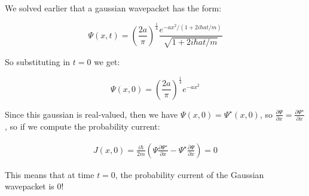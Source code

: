 \documentclass{article}
\begin{document}
\begin{enumerate}[label=(\alph*)]
    \begin{solution}
        We solved earlier that a gaussian wavepacket has the form:
        
        \[ \Psi(x, t) = \left(\frac{2a}{\pi}\right)^{\frac{1}{4}} \frac{e^{-ax^2/(1 + 2i\hbar at/m)}}{\sqrt{1 + 2i\hbar a t/m}}\]

        So substituting in $t = 0$ we get: 

        \[ \Psi(x, 0) = \left(\frac{2a}{\pi}\right)^{\frac{1}{4}} e^{-ax^2}\]

        Since this gaussian is real-valued, then we have $\Psi(x, 0) = \Psi^\star(x, 0)$, so $\frac{\partial \Psi}{\partial x} = \frac{\partial \Psi^\star}{\partial x}$, so if we compute the probability current:

        \begin{align*}
            J(x, 0) = \frac{i\hbar}{2m} \left(\Psi \frac{\partial \Psi^\star}{\partial x} - \Psi^\star\frac{\partial \Psi}{\partial x}\right) = 0
        \end{align*}

        This means that at time $t = 0$, the probability current of the Gaussian wavepacket is 0!
    \end{solution}
\end{enumerate}
\end{document}
